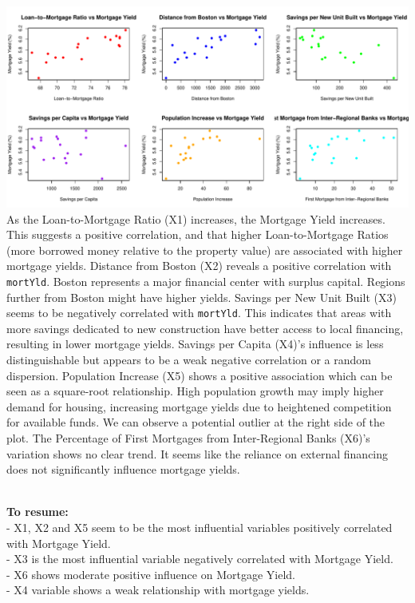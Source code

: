 \documentclass[
  11pt,
]{article}
\begin{document}
\includegraphics{Figs/unnamed-chunk-6-1.pdf}\\
As the Loan-to-Mortgage Ratio (X1) increases, the Mortgage Yield
increases. This suggests a positive correlation, and that higher
Loan-to-Mortgage Ratios (more borrowed money relative to the property
value) are associated with higher mortgage yields. Distance from Boston
(X2) reveals a positive correlation with \texttt{mortYld}. Boston
represents a major financial center with surplus capital. Regions
further from Boston might have higher yields. Savings per New Unit Built
(X3) seems to be negatively correlated with \texttt{mortYld}. This
indicates that areas with more savings dedicated to new construction
have better access to local financing, resulting in lower mortgage
yields. Savings per Capita (X4)'s influence is less distinguishable but
appears to be a weak negative correlation or a random dispersion.
Population Increase (X5) shows a positive association which can be seen
as a square-root relationship. High population growth may imply higher
demand for housing, increasing mortgage yields due to heightened
competition for available funds. We can observe a potential outlier at
the right side of the plot. The Percentage of First Mortgages from
Inter-Regional Banks (X6)'s variation shows no clear trend. It seems
like the reliance on external financing does not significantly influence
mortgage yields.\\
\strut \\
\textbf{To resume:}\\
- X1, X2 and X5 seem to be the most influential variables positively
correlated with Mortgage Yield.\\
- X3 is the most influential variable negatively correlated with
Mortgage Yield.\\
- X6 shows moderate positive influence on Mortgage Yield.\\
- X4 variable shows a weak relationship with mortgage yields.\\
\end{document}
